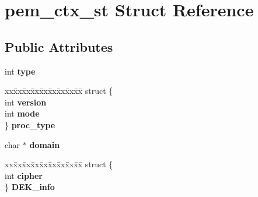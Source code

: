 \hypertarget{structpem__ctx__st}{}\section{pem\+\_\+ctx\+\_\+st Struct Reference}
\label{structpem__ctx__st}
\subsection*{Public Attributes}
\begin{DoxyCompactItemize}
\item 
\mbox{\label{structpem__ctx__st_aa68441b2d1bdccccc8b598a582b42793}} 
int {\bfseries type}
\item 
\mbox{\label{structpem__ctx__st_a68d8bb32e9c21053fa748e8eb2746549}} 
\begin{tabbing}
xx\=xx\=xx\=xx\=xx\=xx\=xx\=xx\=xx\=\kill
struct \{\\
\>int {\bfseries version}\\
\>int {\bfseries mode}\\
\} {\bfseries proc\_type}\\

\end{tabbing}\item 
\mbox{\label{structpem__ctx__st_a626b9c364cf296248d6106e728923e45}} 
char $\ast$ {\bfseries domain}
\item 
\mbox{\label{structpem__ctx__st_a5271326039f062eba880b5938713ef7c}} 
\begin{tabbing}
xx\=xx\=xx\=xx\=xx\=xx\=xx\=xx\=xx\=\kill
struct \{\\
\>int {\bfseries cipher}\\
\} {\bfseries DEK\_info}\\


\end{tabbing}
\end{DoxyCompactItemize}
